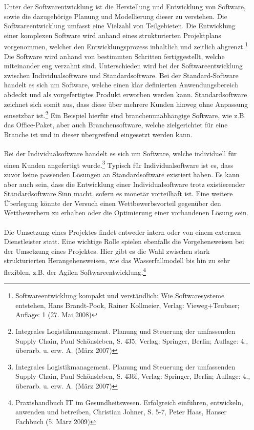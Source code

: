 Unter der Softwarentwicklung ist die Herstellung und Entwicklung von Software, sowie die dazugehörige Planung und Modellierung dieser zu verstehen.
Die Softwareentwicklung umfasst eine Vielzahl von Teilgebieten.
Die Entwicklung einer komplexen Software wird anhand eines strukturierten Projektplans vorgenommen, welcher den Entwicklungsprozess inhaltlich und zeitlich abgrenzt.\footnote{Softwareentwicklung kompakt und verständlich: Wie Softwaresysteme entstehen, Hans Brandt-Pook, Rainer Kollmeier, Verlag: Vieweg+Teubner; Auflage: 1 (27. Mai 2008)}
Die Software wird anhand von bestimmten Schritten fertiggestellt, welche miteinander eng verzahnt sind.
Unterschieden wird bei der Softwareentwicklung zwischen Individualsoftware und Standardsoftware.
Bei der Standard-Software handelt es sich um Software, welche einen klar definierten Anwendungsbereich abdeckt und als vorgefertigtes Produkt erworben werden kann.
Standardsoftware zeichnet sich somit aus, dass diese über mehrere Kunden hinweg ohne Anpassung einsetzbar ist.\footnote{Integrales Logistikmanagement. Planung und Steuerung der umfassenden Supply Chain, Paul Schönsleben, S. 435, Verlag: Springer, Berlin; Auflage: 4., überarb. u. erw. A. (März 2007)}
Ein Beispiel hierfür sind branchenunabhängige Software, wie z.B. das Office-Paket, aber auch Branchensoftware, welche zielgerichtet für eine Branche ist und in dieser übergreifend eingesetzt werden kann.\\\\
Bei der Individualsoftware handelt es sich um Software, welche individuell für einen Kunden angefertigt wurde.\footnote{Integrales Logistikmanagement. Planung und Steuerung der umfassenden Supply Chain, Paul Schönsleben, S. 436f, Verlag: Springer, Berlin; Auflage: 4., überarb. u. erw. A. (März 2007)}
Typisch für Individualsoftware ist es, dass zuvor keine passenden Lösungen an Standardsoftware existiert haben. 
Es kann aber auch sein, dass die Entwicklung einer Individualsoftware trotz existierender Standardsoftware Sinn macht, sofern es monetär vorteilhaft ist.
Eine weitere Überlegung könnte der Versuch einen Wettbewerbsvorteil gegenüber den Wettbewerbern zu erhalten oder die Optimierung einer vorhandenen Lösung sein.\\\\
Die Umsetzung eines Projektes findet entweder intern oder von einem externen Dienstleister statt.
Eine wichtige Rolle spielen ebenfalls die Vorgehensweisen bei der Umsetzung eines Projektes.
Hier gibt es die Wahl zwischen stark strukturierten Herangehensweisen, wie das Wasserfallmodell bis hin zu sehr flexiblen, z.B. der Agilen Softwareentwicklung.\footnote{Praxishandbuch IT im Gesundheitswesen. Erfolgreich einführen, entwickeln, anwenden und betreiben, Christian Johner, S. 5-7, Peter Haas, Hanser Fachbuch (5. März 2009)}
